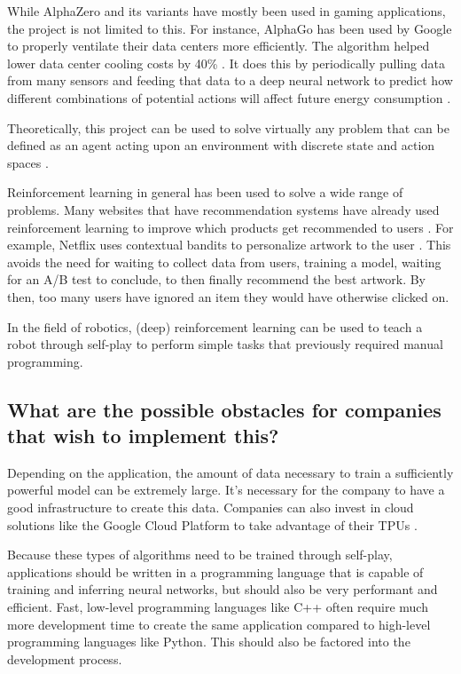 \documentclass{article}
\begin{document}
While AlphaZero and its variants have mostly been used in gaming applications, 
the project is not limited to this. For instance, AlphaGo has been used by Google
to properly ventilate their data centers more efficiently. The algorithm helped lower
data center cooling costs by 40\% \cite{decemberHasGoogleCracked2020}. 
It does this by periodically pulling data from many sensors and feeding that data to 
a deep neural network to predict how different combinations of potential actions
will affect future energy consumption \cite{HowAIHelps2018}.

Theoretically, this project can be used to solve virtually any problem that can be
defined as an agent acting upon an environment with discrete state and action spaces \cite{ReinforcementLearning2022a}.

Reinforcement learning in general has been used to solve a wide range of problems.
Many websites that have recommendation systems have already used reinforcement learning 
to improve which products get recommended to users \cite{nbroAnswerAreThere2020}. 
For example, Netflix uses contextual bandits to personalize artwork to the user \cite{blogArtworkPersonalizationNetflix2017,surmenokContextualBanditsReinforcement2017}.
This avoids the need for waiting to collect data from users, training a model,
waiting for an A/B test to conclude, to then finally recommend the best artwork.
By then, too many users have ignored an item they would have otherwise clicked on.



In the field of robotics, (deep) reinforcement learning can be used to teach a robot
through self-play to perform simple tasks that previously required manual programming.

\subsection{What are the possible obstacles for companies that wish to implement this?}

Depending on the application, the amount of data necessary to train a sufficiently powerful model
can be extremely large. It's necessary for the company to have a good infrastructure to 
create this data. Companies can also invest in cloud solutions like the Google Cloud Platform
to take advantage of their TPUs \cite{CloudComputingServices}.

Because these types of algorithms need to be trained through self-play, applications should be written
in a programming language that is capable of training and inferring neural networks, 
but should also be very performant and efficient. 
Fast, low-level programming languages like C++ often require much more development time
to create the same application compared to high-level programming languages like Python. 
This should also be factored into the development process.
\end{document}
